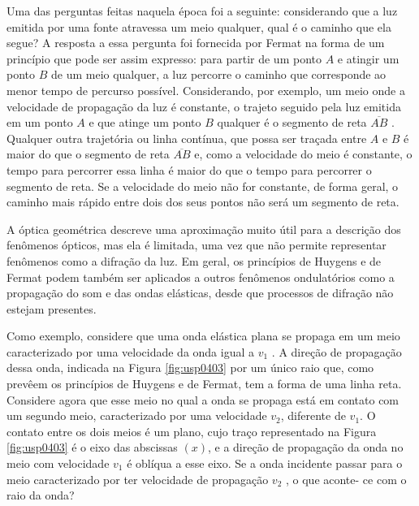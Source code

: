 \documentclass[]{book}
\theoremstyle{definition}
\theoremstyle{definition}
\theoremstyle{definition}
\theoremstyle{remark}
\begin{document}
Uma das perguntas feitas naquela época foi a seguinte: considerando que a luz emitida por uma fonte atravessa um meio qualquer, qual é o caminho que ela segue? A resposta a essa pergunta foi fornecida por Fermat na forma de um princípio que pode ser assim expresso: para partir de um ponto \(A\) e atingir um ponto \(B\) de um meio qualquer, a luz percorre o caminho que corresponde ao menor tempo de percurso possível. Considerando, por exemplo, um meio onde a velocidade de propagação da luz é constante, o trajeto seguido pela luz emitida em um ponto \(A\) e que atinge um ponto \(B\) qualquer é o segmento de reta \(\overline{AB}\) . Qualquer outra trajetória ou linha contínua, que possa ser traçada entre \(A\) e \(B\) é maior do que o segmento de reta \(\overline{AB}\) e, como a velocidade do meio é constante, o tempo para percorrer essa linha é maior do que o tempo para percorrer o segmento de reta. Se a velocidade do meio não for constante, de forma geral, o caminho mais rápido entre dois dos seus pontos não será um segmento de reta.

A óptica geométrica descreve uma aproximação muito útil para a descrição dos fenômenos ópticos, mas ela é limitada, uma vez que não permite representar fenômenos como a difração da luz. Em geral, os princípios de Huygens e de Fermat podem também ser aplicados a outros fenômenos ondulatórios como a propagação do som e das ondas elásticas, desde que processos de difração não estejam presentes.

Como exemplo, considere que uma onda elástica plana se propaga em um meio caracterizado por uma velocidade da onda igual a \(v_1\) . A direção de propagação dessa onda, indicada na Figura \ref{fig:usp0403} por um único raio que, como prevêem os princípios de Huygens e de Fermat, tem a forma de uma linha reta. Considere agora que esse meio no qual a onda se propaga está em contato com um segundo meio, caracterizado por uma velocidade \(v_2\), diferente de \(v_1\). O contato entre os dois meios é um plano, cujo traço representado na Figura \ref{fig:usp0403} é o eixo das abscissas
\((x)\), e a direção de propagação da onda no meio com velocidade \(v_1\) é oblíqua a esse eixo. Se a onda incidente passar para o meio caracterizado por ter velocidade de propagação \(v_2\) , o que aconte- ce com o raio da onda?
\end{document}
